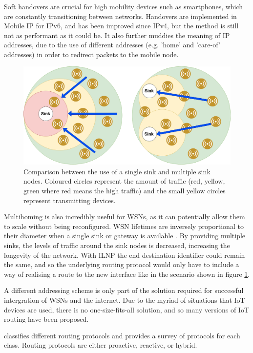 \documentclass[12pt]{article}
\begin{document}
Soft handovers are crucial for high mobility devices such as smartphones, which are constantly transitioning between networks. Handovers are implemented in Mobile IP for IPv6, and has been improved since IPv4, but the method is still not as performant as it could be. It also further muddies the meaning of IP addresses, due to the use of different addresses (e.g. 'home' and 'care-of' addresses) in order to redirect packets to the mobile node. 

\begin{figure}[!ht]
	\centering
	\includegraphics[width=\linewidth]{images/diameter}
	\caption{Comparison between the use of a single sink and multiple sink nodes. Coloured circles represent the amount of traffic (red, yellow, green where red means the high traffic) and the small yellow circles represent transmitting devices.}
	\label{fig:diameter}
\end{figure}

Multihoming is also incredibly useful for WSNs, as it can potentially allow them to scale without being reconfigured. WSN lifetimes are inversely proportional to their diameter when a single sink or gateway is available \cite{multisink}. By providing multiple sinks, the levels of traffic around the sink nodes is decreased, increasing the longevity of the network. With ILNP the end destination identifier could remain the same, and so the underlying routing protocol would only have to include a way of realising a route to the new interface like in the scenario shown in figure \ref{fig:diameter}.

A different addressing scheme is only part of the solution required for successful intergration of WSNs and the internet. Due to the myriad of situations that IoT devices are used, there is no one-size-fits-all solution, and so many versions of IoT routing have been proposed.

\cite{hassan} classifies different routing protocols and provides a survey of protocols for each class. Routing protocols are either proactive, reactive, or hybrid. 
\end{document}
